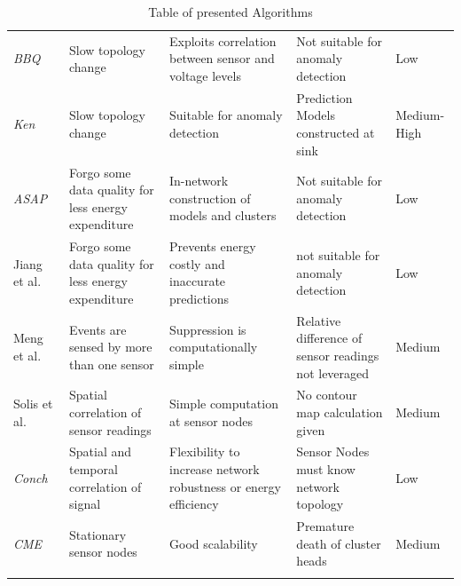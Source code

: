 \begin{longtable} { |p{}||p{}|p{}|p{}|p{}| }
        \textit{BBQ}~\cite{deshpande2004model}& Slow topology change & Exploits
        correlation between sensor and voltage levels & Not suitable for
        anomaly detection & Low\\ %

        \textit{Ken}~\cite{chu2006approximate}& Slow topology
        change~\cite{gedik2007asap} & Suitable for anomaly detection &
        Prediction Models constructed at sink~\cite{gedik2007asap}  &
        Medium-High~\cite{gedik2007asap}\\ %

        \textit{ASAP}~\cite{gedik2007asap}& Forgo some data quality for less
        energy expenditure & In-network construction of models and clusters &
        Not suitable for anomaly detection & Low\\ %

        Jiang et al.~\cite{jiang2011prediction}& Forgo some data quality for
        less energy expenditure & Prevents energy costly and inaccurate
        predictions & not suitable for anomaly detection & Low\\

        Meng et al.~\cite{meng2004event}& Events are sensed by more than one
        sensor & Suppression is computationally simple & Relative difference of
        sensor readings not leveraged~\cite{silberstein2006constraint}& Medium\\

        Solis et al.~\cite{solis2005efficient}& Spatial correlation of sensor
        readings & Simple computation at sensor nodes & No contour map
        calculation given~\cite{xu2008cme} & Medium\\ %

        \textit{Conch}~\cite{silberstein2006constraint}& Spatial and temporal
        correlation of signal & Flexibility to increase network robustness or
        energy efficiency & Sensor Nodes must know network
        topology~\cite{trihinas2017admin}& Low\\ %

        \textit{CME}~\cite{xu2008cme} & Stationary sensor nodes & Good
        scalability~\cite{khelil2014comparative} & Premature death of cluster
        heads~\cite{khelil2014comparative} & Medium\\

        \hline
        \caption{Table of presented Algorithms}
        \label{table:algorithm table}
        \end{longtable}

